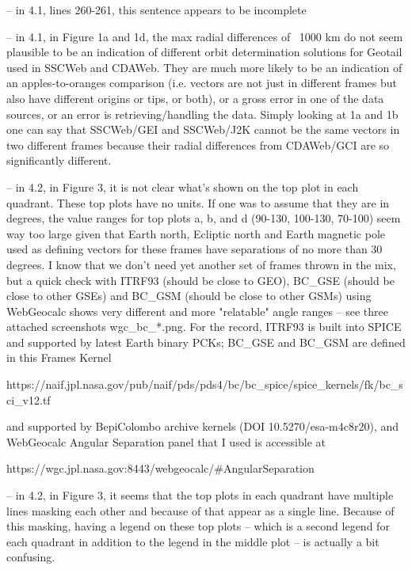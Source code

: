  

-- in 4.1, lines 260-261, this sentence appears to be incomplete

 

 

-- in 4.1, in Figure 1a and 1d, the max radial differences of ~1000 km do not seem plausible to be an indication of different orbit determination solutions for Geotail used in SSCWeb and CDAWeb. They are much more likely to be an indication of an apples-to-oranges comparison (i.e. vectors are not just in different frames but also have different origins or tips, or both), or a gross error in one of the data sources, or an error is retrieving/handling the data. Simply looking at 1a and 1b one can say that SSCWeb/GEI and SSCWeb/J2K cannot be the same vectors in two different frames because their radial differences from CDAWeb/GCI are so significantly different.

 

 

-- in 4.2, in Figure 3, it is not clear what’s shown on the top plot in each quadrant. These top plots have no units. If one was to assume that they are in degrees, the value ranges for top plots a, b, and d (90-130, 100-130, 70-100) seem way too large given that Earth north, Ecliptic north and Earth magnetic pole used as defining vectors for these frames have separations of no more than 30 degrees. I know that we don’t need yet another set of frames thrown in the mix, but a quick check with ITRF93 (should be close to GEO), BC_GSE (should be close to other GSEs) and BC_GSM (should be close to other GSMs) using WebGeocalc shows very different and more "relatable" angle ranges -- see three attached screenshots wgc_bc_*.png. For the record, ITRF93 is built into SPICE and supported by latest Earth binary PCKs; BC_GSE and BC_GSM are defined in this Frames Kernel

 

   https://naif.jpl.nasa.gov/pub/naif/pds/pds4/bc/bc_spice/spice_kernels/fk/bc_sci_v12.tf

 

and supported by BepiColombo archive kernels (DOI 10.5270/esa-m4c8r20), and WebGeocalc Angular Separation panel that I used is accessible at

 

   https://wgc.jpl.nasa.gov:8443/webgeocalc/#AngularSeparation

 

 

-- in 4.2, in Figure 3, it seems that the top plots in each quadrant have multiple lines masking each other and because of that appear as a single line. Because of this masking, having a legend on these top plots -- which is a second legend for each quadrant in addition to the legend in the middle plot -- is actually a bit confusing.


